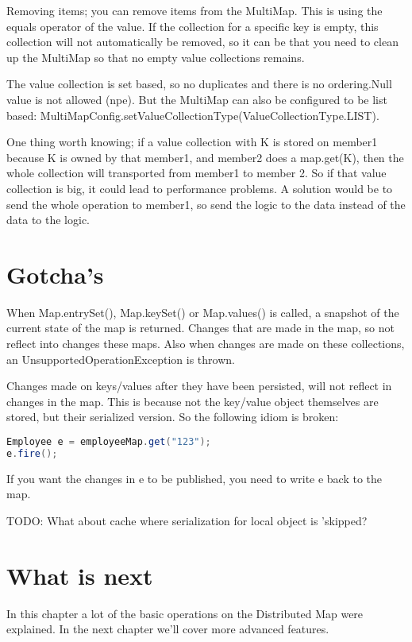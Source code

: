 Removing items; you can remove items from the MultiMap. This is using the equals operator of the value. If the collection for a specific key is empty, this collection will not automatically be removed, so it can be that you need to clean up the MultiMap so that no empty value collections remains.

The value collection is set based, so no duplicates and there is no ordering.Null value is not allowed (npe). But the MultiMap can also be configured to be list based: MultiMapConfig.setValueCollectionType(ValueCollectionType.LIST). 

One thing worth knowing; if a value collection with K is stored on member1 because K is owned by that member1, and member2 does a map.get(K), then the whole collection will transported from member1 to member 2. So if that value collection is big, it could lead to performance problems. A solution would be to send the whole operation to member1, so send the logic to the data instead of the data to the logic.

\section{Gotcha's}
When Map.entrySet(), Map.keySet() or Map.values() is called, a snapshot of the current state of the map is returned. Changes that are made in the map, so not reflect into changes these maps. Also when changes are made on these collections, an UnsupportedOperationException is thrown.

Changes made on keys/values after they have been persisted, will not reflect in changes in the map. This is because not the key/value object themselves are stored, but their serialized version. So the following idiom is broken:
\begin{lstlisting}[language=java]
Employee e = employeeMap.get("123");
e.fire();
\end{lstlisting}
If you want the changes in e to be published, you need to write e back to the map.

TODO: What about cache where serialization for local object is 'skipped?

\section{What is next}
In this chapter a lot of the basic operations on the Distributed Map were explained. In the next chapter we'll cover more advanced features.
